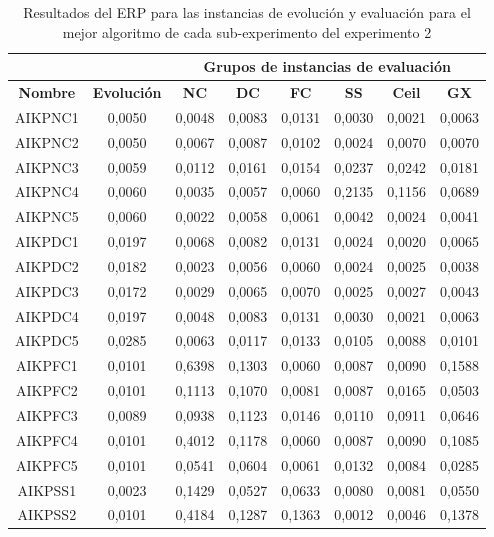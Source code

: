 \begin{table}[hbtp!]
\caption{Resultados del ERP para las instancias de evolución y evaluación para el mejor algoritmo de cada sub-experimento del experimento 2}\label{tab:evol_vs_eval_completa_exp2}
\small
\centering
\begin{center}
\begin{tabular}{cc|cccccc}
\multicolumn{2}{c|}{{\textbf{}}} & \multicolumn{6}{c}{{\textbf{Grupos de instancias de evaluación}}} \\ \hline
{\textbf{Nombre}} & {\textbf{Evolución}} & {\textbf{NC}} & {\textbf{DC}} & {\textbf{FC}} & {\textbf{SS}} & {\textbf{Ceil}} & {\textbf{GX}} \\ \hline
AIKPNC1 & 0,0050 & 0,0048 & 0,0083 & 0,0131 & 0,0030 & 0,0021 & 0,0063 \\
AIKPNC2 & 0,0050 & 0,0067 & 0,0087 & 0,0102 & 0,0024 & 0,0070 & 0,0070 \\
AIKPNC3 & 0,0059 & 0,0112 & 0,0161 & 0,0154 & 0,0237 & 0,0242 & 0,0181 \\
AIKPNC4 & 0,0060 & 0,0035 & 0,0057 & 0,0060 & 0,2135 & 0,1156 & 0,0689 \\
AIKPNC5 & 0,0060 & 0,0022 & 0,0058 & 0,0061 & 0,0042 & 0,0024 & 0,0041 \\ \hline
AIKPDC1 & 0,0197 & 0,0068 & 0,0082 & 0,0131 & 0,0024 & 0,0020 & 0,0065 \\
AIKPDC2 & 0,0182 & 0,0023 & 0,0056 & 0,0060 & 0,0024 & 0,0025 & 0,0038 \\
AIKPDC3 & 0,0172 & 0,0029 & 0,0065 & 0,0070 & 0,0025 & 0,0027 & 0,0043 \\
AIKPDC4 & 0,0197 & 0,0048 & 0,0083 & 0,0131 & 0,0030 & 0,0021 & 0,0063 \\
AIKPDC5 & 0,0285 & 0,0063 & 0,0117 & 0,0133 & 0,0105 & 0,0088 & 0,0101 \\ \hline
AIKPFC1 & 0,0101 & 0,6398 & 0,1303 & 0,0060 & 0,0087 & 0,0090 & 0,1588 \\
AIKPFC2 & 0,0101 & 0,1113 & 0,1070 & 0,0081 & 0,0087 & 0,0165 & 0,0503 \\
AIKPFC3 & 0,0089 & 0,0938 & 0,1123 & 0,0146 & 0,0110 & 0,0911 & 0,0646 \\
AIKPFC4 & 0,0101 & 0,4012 & 0,1178 & 0,0060 & 0,0087 & 0,0090 & 0,1085 \\
AIKPFC5 & 0,0101 & 0,0541 & 0,0604 & 0,0061 & 0,0132 & 0,0084 & 0,0285 \\ \hline
AIKPSS1 & 0,0023 & 0,1429 & 0,0527 & 0,0633 & 0,0080 & 0,0081 & 0,0550 \\
AIKPSS2 & 0,0101 & 0,4184 & 0,1287 & 0,1363 & 0,0012 & 0,0046 & 0,1378 \\

\end{tabular}
\end{center}
\end{table}
